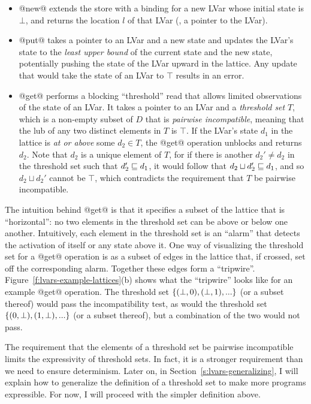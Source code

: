 \begin{itemize}
\item @new@ extends the store with a binding for a new LVar whose
  initial state is $\bot$, and returns the location $l$ of that LVar
  (\ie, a pointer to the LVar).
\item @put@ takes a pointer to an LVar and a new state and updates the
  LVar's state to the \emph{least upper bound} of the current state
  and the new state, potentially pushing the state of the LVar upward
  in the lattice.  Any update that would take the state of an LVar to
  $\top$ results in an error.
\item @get@ performs a blocking ``threshold'' read that allows limited
  observations of the state of an LVar.  It takes a pointer to an LVar
  and a \emph{threshold set} $T$, which is a non-empty subset of $D$
  that is \emph{pairwise incompatible}, meaning that the lub of any
  two distinct elements in $T$ is $\top$.  If the LVar's state $d_1$
  in the lattice is \emph{at or above} some $d_2 \in T$, the @get@
  operation unblocks and returns $d_2$.  Note that $d_2$ is a unique
  element of $T$, for if there is another $d_2' \neq d_2$ in the
  threshold set such that $d_2' \sqsubseteq d_1$, it would follow that
  $d_2 \sqcup d_2' \sqsubseteq d_1$, and so $d_2 \sqcup d_2'$ cannot be
  $\top$, which contradicts the requirement that $T$ be pairwise
  incompatible.
\end{itemize}

The intuition behind @get@ is that it specifies a subset of the
lattice that is ``horizontal'': no two elements in the threshold set
can be above or below one another.  Intuitively, each element in the
threshold set is an ``alarm'' that detects the activation of itself or
any state above it.  One way of visualizing the threshold set for a
@get@ operation is as a subset of edges in the lattice that, if
crossed, set off the corresponding alarm.  Together these edges form a
``tripwire''.  Figure~\ref{f:lvars-example-lattices}(b) shows what the
``tripwire'' looks like for an example @get@ operation.  The
threshold set $\lbrace (\bot, 0), (\bot, 1), ... \rbrace$ (or a subset
thereof) would pass the incompatibility test, as would the threshold
set $\lbrace (0, \bot), (1, \bot), ... \rbrace$ (or a subset thereof), but
a combination of the two would not pass.

The requirement that the elements of a threshold set be pairwise
incompatible limits the expressivity of threshold sets.  In fact, it
is a stronger requirement than we need to ensure determinism.  Later
on, in Section~\ref{s:lvars-generalizing}, I will explain how to
generalize the definition of a threshold set to make more programs
expressible.  For now, I will proceed with the simpler definition
above.


